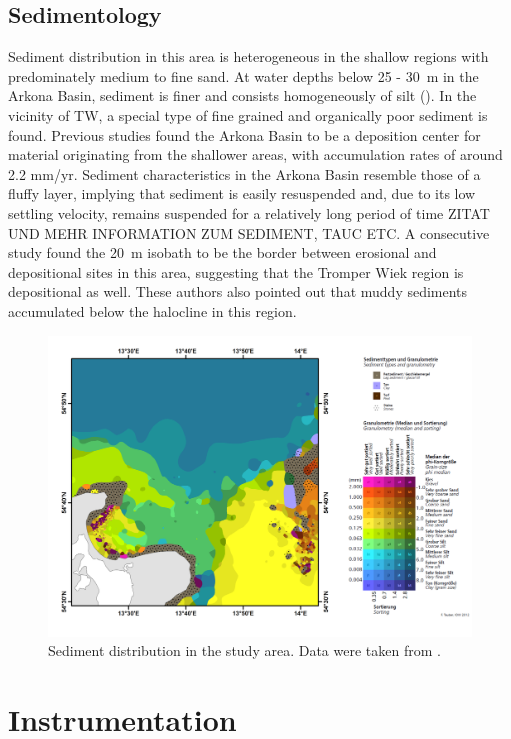  \FloatBarrier
\subsection{Sedimentology}

  Sediment distribution in this area is heterogeneous in the shallow regions 
with predominately medium to fine sand. At water depths below 25 - 30~m in the 
Arkona Basin, sediment is finer and consists homogeneously of silt 
(). In the vicinity of TW, a special type of fine grained and 
organically poor sediment is found. Previous studies \citep[][]{leipe2000, 
basys1} found the Arkona Basin to be a deposition center for material 
originating from the shallower areas, with accumulation rates of around 2.2 
mm/yr. Sediment characteristics in the Arkona Basin resemble those of a 
fluffy layer, implying that sediment is easily resuspended and, due to its low 
settling 
velocity, remains suspended for a relatively long period of time ZITAT UND 
MEHR INFORMATION ZUM SEDIMENT, TAUC ETC. A consecutive 
study \citep[][]{basys2} found the 20~m isobath to be the border between 
erosional and depositional sites in this area, suggesting that the Tromper Wiek 
region is depositional as well. These authors also pointed out that muddy 
sediments accumulated below the halocline in this region.
 \begin{figure}[ht]
\includegraphics[width=30pc]{bilder/TW.pdf}
 \caption{Sediment distribution in the study area. Data were taken from 
\cite{tauber2012}.}
 \label{tauberkarte}
 \end{figure}

\section{Instrumentation}

